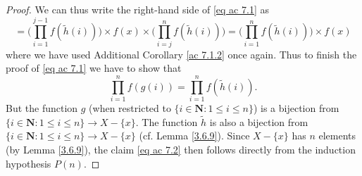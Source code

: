 \begin{proof}
We can thus write the right-hand side of \eqref{eq ac 7.1} as
\[
    = \Bigg(\prod_{i = 1}^{j - 1} f(\tilde{h}(i))\Bigg) \times f(x) \times \Bigg(\prod_{i = j}^n f(\tilde{h}(i))\Bigg) = \Bigg(\prod_{i = 1}^n f(\tilde{h}(i))\Bigg) \times f(x)
\]
where we have used Additional Corollary \ref{ac 7.1.2} once again.
Thus to finish the proof of \eqref{eq ac 7.1} we have to show that
\[
    \prod_{i = 1}^n f(g(i)) = \prod_{i = 1}^n f(\tilde{h}(i)). \tag{ac 7.2}\label{eq ac 7.2}
\]
But the function \(g\) (when restricted to \(\{i \in \mathbf{N} : 1 \leq i \leq n\}\)) is a bijection from \(\{i \in \mathbf{N} : 1 \leq i \leq n\} \to X - \{x\}\).
The function \(\tilde{h}\) is also a bijection from \(\{i \in \mathbf{N} : 1 \leq i \leq n\} \to X - \{x\}\) (cf. Lemma \ref{3.6.9}).
Since \(X - \{x\}\) has \(n\) elements (by Lemma \ref{3.6.9}), the claim \eqref{eq ac 7.2} then follows directly from the induction hypothesis \(P(n)\).
\end{proof}

